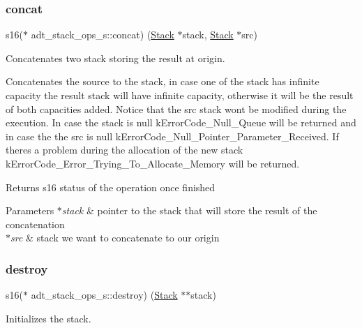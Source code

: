 \subsubsection{\texorpdfstring{concat}{concat}}
{\footnotesize\ttfamily s16($\ast$ adt\+\_\+stack\+\_\+ops\+\_\+s\+::concat) (\hyperlink{structadt__stack__s}{Stack} $\ast$stack, \hyperlink{structadt__stack__s}{Stack} $\ast$src)}



Concatenates two stack storing the result at origin. 

Concatenates the source to the stack, in case one of the stack has infinite capacity the result stack will have infinite capacity, otherwise it will be the result of both capacities added. Notice that the src stack won\textquotesingle{}t be modified during the execution. In case the stack is null k\+Error\+Code\+\_\+\+Null\+\_\+\+Queue will be returned and in case the the src is null k\+Error\+Code\+\_\+\+Null\+\_\+\+Pointer\+\_\+\+Parameter\+\_\+\+Received. If there\textquotesingle{}s a problem during the allocation of the new stack k\+Error\+Code\+\_\+\+Error\+\_\+\+Trying\+\_\+\+To\+\_\+\+Allocate\+\_\+\+Memory will be returned.

\begin{DoxyReturn}{Returns}
s16 status of the operation once finished 
\end{DoxyReturn}

\begin{DoxyParams}{Parameters}
{\em $\ast$stack} & pointer to the stack that will store the result of the concatenation \\
\hline
{\em $\ast$src} & stack we want to concatenate to our origin \\
\hline
\end{DoxyParams}
\mbox{\label{structadt__stack__ops__s_ad3a6a6641cf29b37d37eabe475edb80d}} 
\subsubsection{\texorpdfstring{destroy}{destroy}}
{\footnotesize\ttfamily s16($\ast$ adt\+\_\+stack\+\_\+ops\+\_\+s\+::destroy) (\hyperlink{structadt__stack__s}{Stack} $\ast$$\ast$stack)}



Initializes the stack. 

